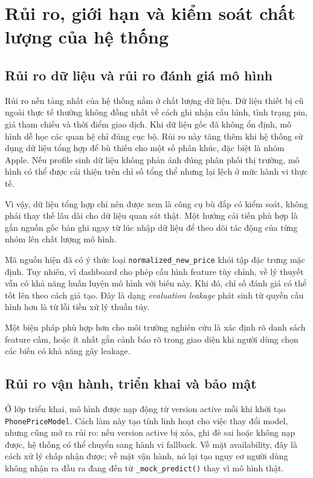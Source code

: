 \section{Rủi ro, giới hạn và kiểm soát chất lượng của hệ thống}

\subsection{Rủi ro dữ liệu và rủi ro đánh giá mô hình}

Rủi ro nền tảng nhất của hệ thống nằm ở chất lượng dữ liệu. Dữ liệu thiết bị cũ ngoài thực tế thường không đồng nhất về cách ghi nhận cấu hình, tình trạng pin, giá tham chiếu và thời điểm giao dịch. Khi dữ liệu gốc đã không ổn định, mô hình dễ học các quan hệ chỉ đúng cục bộ. Rủi ro này tăng thêm khi hệ thống sử dụng dữ liệu tổng hợp để bù thiếu cho một số phân khúc, đặc biệt là nhóm Apple. Nếu profile sinh dữ liệu không phản ánh đúng phân phối thị trường, mô hình có thể được cải thiện trên chỉ số tổng thể nhưng lại lệch ở mức hành vi thực tế.

Vì vậy, dữ liệu tổng hợp chỉ nên được xem là công cụ bù đắp có kiểm soát, không phải thay thế lâu dài cho dữ liệu quan sát thật. Một hướng cải tiến phù hợp là gắn nguồn gốc bản ghi ngay từ lúc nhập dữ liệu để theo dõi tác động của từng nhóm lên chất lượng mô hình.


Mã nguồn hiện đã có ý thức loại \texttt{normalized\_new\_price} khỏi tập đặc trưng mặc định. Tuy nhiên, vì dashboard cho phép cấu hình feature tùy chỉnh, về lý thuyết vẫn có khả năng huấn luyện mô hình với biến này. Khi đó, chỉ số đánh giá có thể tốt lên theo cách giả tạo. Đây là dạng \textit{evaluation leakage} phát sinh từ quyền cấu hình hơn là từ lỗi tiền xử lý thuần túy.

Một biện pháp phù hợp hơn cho môi trường nghiên cứu là xác định rõ danh sách feature cấm, hoặc ít nhất gắn cảnh báo rõ trong giao diện khi người dùng chọn các biến có khả năng gây leakage.

\subsection{Rủi ro vận hành, triển khai và bảo mật}


Ở lớp triển khai, mô hình được nạp động từ version active mỗi khi khởi tạo \texttt{PhonePriceModel}. Cách làm này tạo tính linh hoạt cho việc thay đổi model, nhưng cũng mở ra rủi ro: nếu version active bị xóa, ghi đè sai hoặc không nạp được, hệ thống có thể chuyển sang hành vi fallback. Về mặt availability, đây là cách xử lý chấp nhận được; về mặt vận hành, nó lại tạo nguy cơ người dùng không nhận ra đầu ra đang đến từ \texttt{\_mock\_predict()} thay vì mô hình thật.

